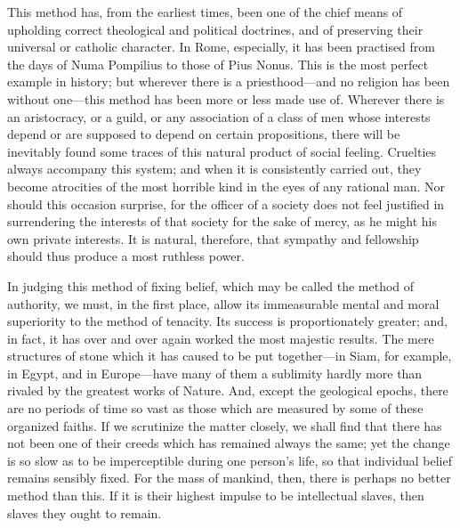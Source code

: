 This method has, from the earliest times, been one of the chief means
of upholding correct theological and political doctrines, and of
preserving their universal or catholic character. In Rome, especially,
it has been practised from the days of Numa Pompilius to those of Pius
Nonus. This is the most perfect example in history; but wherever there
is a priest\-hood---and no religion has been without one---this method
has been more or less made use of. Wherever there is an aristocracy,
or a guild, or any association of a class of men whose interests
depend or are supposed to depend on certain propositions, there will
be inevitably found some traces of this natural product of social
feeling. Cruelties always accompany this system; and when it is
consistently carried out, they become atrocities of the most horrible
kind in the eyes of any rational man. Nor should this occasion
surprise, for the officer of a society does not feel justified in
surrendering the interests of that society for the sake of mercy, as
he might his own private interests. It is natural, therefore, that
sympathy and fellowship should thus produce a most ruthless power.

In judging this method of fixing belief, which may be called the
method of authority, we must, in the first place, allow its
immeasurable mental and moral superiority to the method of tenacity.
Its success is proportionately greater; and, in fact, it has over and
over again worked the most majestic results. The mere structures of
stone which it has caused to be put to\-geth\-er---in Siam, for
example, in Egypt, and in Eu\-rope---have many of them a sublimity
hardly more than rivaled by the greatest works of Nature. And, except
the geological epochs, there are no periods of time so vast as those
which are measured by some of these organized faiths. If we scrutinize
the matter closely, we shall find that there has not been one of their
creeds which has remained always the same; yet the change is so slow
as to be imperceptible during one person's life, so that individual
belief remains sensibly fixed. For the mass of mankind, then, there is
perhaps no better method than this. If it is their highest impulse to
be intellectual slaves, then slaves they ought to remain.

